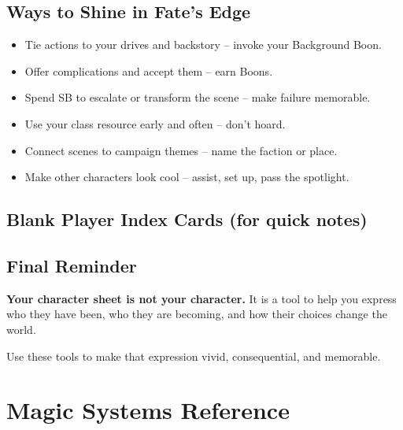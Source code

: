 \subsection{Ways to Shine in Fate's Edge}

\begin{itemize}
    \item Tie actions to your drives and backstory -- invoke your Background Boon.
    \item Offer complications and accept them -- earn Boons.
    \item Spend SB to escalate or transform the scene -- make failure memorable.
    \item Use your class resource early and often -- don't hoard.
    \item Connect scenes to campaign themes -- name the faction or place.
    \item Make other characters look cool -- assist, set up, pass the spotlight.
\end{itemize}

\subsection{Blank Player Index Cards (for quick notes)}

\begin{center}
\end{center}

\begin{center}
\end{center}

\subsection{Final Reminder}

\textbf{Your character sheet is not your character.}  
It is a tool to help you express who they have been, who they are becoming, and how their choices change the world.

Use these tools to make that expression vivid, consequential, and memorable.

\clearpage

\section{Magic Systems Reference}
\label{app:magic-ref}

